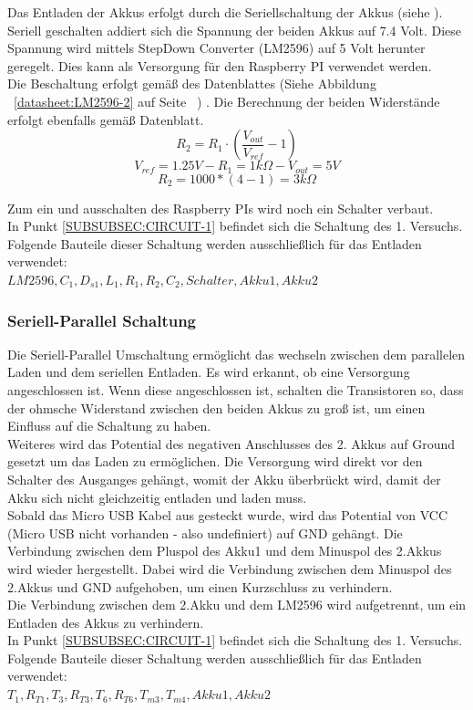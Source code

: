 \documentclass[12pt,a4paper]{article}
\begin{document}
{Das Entladen der Akkus erfolgt durch die Seriellschaltung der Akkus (siehe ). Seriell geschalten addiert sich die Spannung der beiden Akkus auf 7.4 Volt. Diese Spannung wird mittels StepDown Converter (LM2596) auf 5 Volt herunter geregelt.  Dies kann als Versorgung für den Raspberry PI verwendet werden. \\
Die Beschaltung erfolgt gemäß des Datenblattes (Siehe Abbildung ~\ref{datasheet:LM2596-2} auf Seite ~\pageref{datasheet:LM2596-2}) . Die Berechnung der beiden Widerstände erfolgt ebenfalls gemäß Datenblatt.
\[R_2 = R_1 \cdot \left(\frac{V_{out}}{V_{ref}} - 1 \right)\]
\[V_{ref} = 1.25 V - R_1 = 1 k\Omega - V_{out} = 5V\]
\[R_2 = 1000*(4-1) = 3 k\Omega\]

Zum ein und ausschalten des Raspberry PIs wird noch ein Schalter verbaut. \\
In Punkt \ref{SUBSUBSEC:CIRCUIT-1} befindet sich die Schaltung des 1. Versuchs. Folgende Bauteile dieser Schaltung werden ausschließlich für das Entladen verwendet:\\ $LM2596,C_1,D_{s1},L_1,R_1,R_2,C_2,Schalter,Akku1, Akku2$ \\

\subsubsection{Seriell-Parallel Schaltung}
\label{SUBSUBSEC:SERPAR}

Die Seriell-Parallel Umschaltung ermöglicht das wechseln zwischen dem parallelen Laden und dem seriellen Entladen. Es wird erkannt, ob eine Versorgung angeschlossen ist. Wenn diese angeschlossen ist, schalten die Transistoren so, dass der ohmsche Widerstand zwischen den beiden Akkus zu groß ist, um einen Einfluss auf die Schaltung zu haben.\\
Weiteres wird das Potential des negativen Anschlusses des 2. Akkus auf Ground gesetzt um das Laden zu ermöglichen. Die Versorgung wird direkt vor den Schalter des Ausganges gehängt, womit der Akku überbrückt wird, damit der Akku sich nicht gleichzeitig entladen und laden muss. \\[2ex] 
Sobald das Micro USB Kabel aus gesteckt wurde, wird das Potential von VCC (Micro USB nicht vorhanden - also undefiniert) auf GND gehängt. Die Verbindung zwischen dem Pluspol des Akku1 und dem Minuspol des 2.Akkus wird wieder hergestellt. Dabei wird die Verbindung zwischen dem Minuspol des 2.Akkus und GND aufgehoben, um einen Kurzschluss zu verhindern.  \\
Die Verbindung zwischen dem 2.Akku und dem LM2596 wird aufgetrennt, um ein Entladen des Akkus zu verhindern. \\
In Punkt \ref{SUBSUBSEC:CIRCUIT-1} befindet sich die Schaltung des 1. Versuchs. Folgende Bauteile dieser Schaltung werden ausschließlich für das Entladen verwendet:\\ $T_1,R_{T1},T_3,R_{T3},T_6,R_{T6},T_{m3},T_{m4}, Akku1, Akku2$ \\

}
\end{document}
